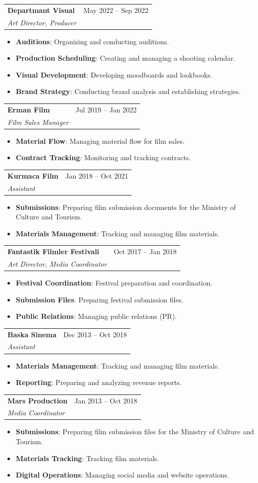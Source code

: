 \documentclass[letterpaper,11pt]{article}
\makeatletter
\newcommand{\resumeItem}[2]{
  \item\small{
    \textbf{#1}{: #2 \vspace{-2pt}}
  }
}
\newcommand{\resumeSubheading}[4]{
  \vspace{-1pt}\item
    \begin{tabular*}{0.97\textwidth}[t]{l@{\extracolsep{\fill}}r}
      \textbf{#1} & #2 \\
      \textit{\small#3} & \textit{\small #4} \\
    \end{tabular*}\vspace{-5pt}
}
\newcommand{\resumeItemListStart}{\begin{itemize}}
\newcommand{\resumeItemListEnd}{\end{itemize}\vspace{-5pt}}
\makeatother
\begin{document}
    \resumeSubheading
      {Departmant Visual}{May 2022 -- Sep 2022}
      {Art Director, Producer}{}
      \resumeItemListStart
        \resumeItem{Auditions}
          {Organizing and conducting auditions.}
        \resumeItem{Production Scheduling}
          {Creating and managing a shooting calendar.}
        \resumeItem{Visual Development}
          {Developing moodboards and lookbooks.}
        \resumeItem{Brand Strategy}
          {Conducting brand analysis and establishing strategies.}
      \resumeItemListEnd

    \resumeSubheading
      {Erman Film}{Jul 2019 -- Jan 2022}
      {Film Sales Manager}{}
      \resumeItemListStart
        \resumeItem{Material Flow}
          {Managing material flow for film sales.}
        \resumeItem{Contract Tracking}
          {Monitoring and tracking contracts.}
      \resumeItemListEnd

    \resumeSubheading
      {Kurmaca Film}{Jan 2018 -- Oct 2021}
      {Assistant}{}
      \resumeItemListStart
        \resumeItem{Submissions}
          {Preparing film submission documents for the Ministry of Culture and Tourism.}
        \resumeItem{Materials Management}
          {Tracking and managing film materials.}
      \resumeItemListEnd

    \resumeSubheading
      {Fantastik Filmler Festivali}{Oct 2017 -- Jan 2018}
      {Art Director, Media Coordinator}{}
      \resumeItemListStart
        \resumeItem{Festival Coordination}
          {Festival preparation and coordination.}
        \resumeItem{Submission Files}
          {Preparing festival submission files.}
        \resumeItem{Public Relations}
          {Managing public relations (PR).}
      \resumeItemListEnd

    \resumeSubheading
      {Baska Sinema}{Dec 2013 -- Oct 2018}
      {Assistant}{}
      \resumeItemListStart
        \resumeItem{Materials Management}
          {Tracking and managing film materials.}
        \resumeItem{Reporting}
          {Preparing and analyzing revenue reports.}
      \resumeItemListEnd

    \resumeSubheading
      {Mars Production}{Jan 2013 -- Oct 2018}
      {Media Coordinator}{}
      \resumeItemListStart
        \resumeItem{Submissions}
          {Preparing film submission files for the Ministry of Culture and Tourism.}
        \resumeItem{Materials Tracking}
          {Tracking film materials.}
        \resumeItem{Digital Operations}
          {Managing social media and website operations.}
      \resumeItemListEnd
\end{document}
